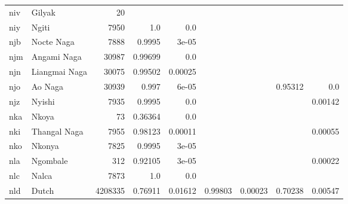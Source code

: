 \documentclass[11pt]{article}
\begin{document}
\begin{table*}[h]
{\begin{tabular}{llrrrrrrr}
niv         & Gilyak         & 20         &          &          &          &          &          &          \\

niy         & Ngiti         & 7950         & 1.0         & 0.0         &          &          &          &          \\

njb         & Nocte Naga         & 7888         & 0.9995         & 3e-05         &          &          &          &          \\

njm         & Angami Naga         & 30987         & 0.99699         & 0.0         &          &          &          &          \\

njn         & Liangmai Naga         & 30075         & 0.99502         & 0.00025         &          &          &          &          \\

njo         & Ao Naga         & 30939         & 0.997         & 6e-05         &          &          & 0.95312         & 0.0         \\

njz         & Nyishi         & 7935         & 0.9995         & 0.0         &          &          &          & 0.00142         \\

nka         & Nkoya         & 73         & 0.36364         & 0.0         &          &          &          &          \\

nki         & Thangal Naga         & 7955         & 0.98123         & 0.00011         &          &          &          & 0.00055         \\

nko         & Nkonya         & 7825         & 0.9995         & 3e-05         &          &          &          &          \\

nla         & Ngombale         & 312         & 0.92105         & 3e-05         &          &          &          & 0.00022         \\

nlc         & Nalca         & 7873         & 1.0         & 0.0         &          &          &          &          \\

nld         & Dutch         & 4208335         & 0.76911         & 0.01612         & 0.99803         & 0.00023         & 0.70238         & 0.00547         \\


\end{tabular}}
\end{table*}
\end{document}
